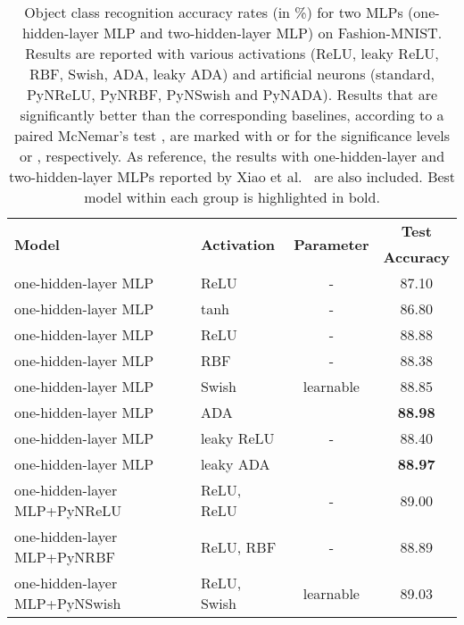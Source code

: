 \documentclass[pdflatex,sn-mathphys]{sn-jnl}
\theoremstyle{thmstyleone}
\theoremstyle{thmstyletwo}\newtheorem{example}{Example}\newtheorem{remark}{Remark}
\theoremstyle{thmstylethree}\newtheorem{definition}{Definition}\DeclareMathOperator{\sinc}{sinc}
\begin{document}
\begin{table}[!t]
\setlength\tabcolsep{1.6pt}
\caption{\small{Object class recognition accuracy rates (in \%) for two MLPs (one-hidden-layer MLP and two-hidden-layer MLP) on Fashion-MNIST. Results are reported with various activations (ReLU, leaky ReLU, RBF, Swish, ADA, leaky ADA) and artificial neurons (standard, PyNReLU, PyNRBF, PyNSwish and PyNADA). Results that are significantly better than the corresponding baselines, according to a paired McNemar's test \citep{Dietterich-NC-1998}, are marked with  or  for the significance levels  or , respectively. As reference, the results with one-hidden-layer and two-hidden-layer MLPs reported by Xiao et al.~\cite{Xiao-A-2017} are also included. 
Best model within each group is highlighted in bold.}}
\label{tab_Fashion_MNIST_a}
\scriptsize{
\begin{center}
\begin{tabular}{llcc}
\toprule
\multirow{2}{*}{\bf Model}                           & \multirow{2}{*}{\bf Activation}        & \multirow{2}{*}{\bf Parameter}             & {\bf Test}\\
&        &             & {\bf Accuracy}\\
\midrule
one-hidden-layer MLP~\citep{Xiao-A-2017} & ReLU		& -	                    & 87.10\\
one-hidden-layer MLP~\citep{Xiao-A-2017} & tanh		& -	                    & 86.80\\
\midrule
one-hidden-layer MLP              & ReLU		    & -	                    & 88.88\\
one-hidden-layer MLP              & RBF	            & -                     & 88.38\\
one-hidden-layer MLP              & Swish	        & learnable     & 88.85\\
one-hidden-layer MLP              & ADA 		    &           & {\bf 88.98}\\ \midrule
one-hidden-layer MLP              & leaky ReLU	    & -                     & 88.40\\
one-hidden-layer MLP              & leaky ADA 	    & 	        & {\bf 88.97}\\ 
\midrule
one-hidden-layer MLP+PyNReLU      & ReLU, ReLU 	    & -                     & 89.00\\
one-hidden-layer MLP+PyNRBF       & ReLU, RBF 	    & -	                    & 88.89\\
one-hidden-layer MLP+PyNSwish     & ReLU, Swish     & learnable     & 89.03\\

\end{tabular}
\end{center}}
\end{table}
\end{document}
